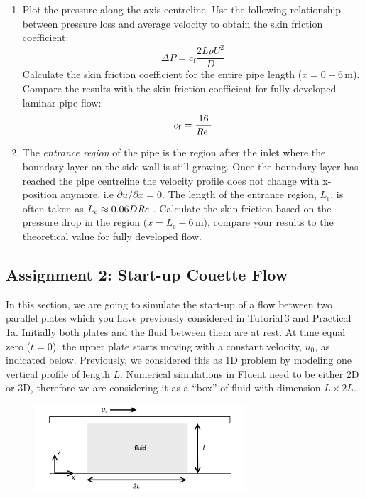 \documentclass[11pt,a4paper,oneside,hidelinks]{scrartcl}
\newcommand\Rey{\mbox{\textit{Re}}\,\,}
\begin{document}
\begin{enumerate}
   \item Plot the pressure along the axis centreline. Use the following relationship between pressure loss and average velocity to obtain the skin friction coefficient: 
\begin{equation}
    \Delta P=c_\mathrm{f}\frac{2L\rho U^2}{D}
\end{equation}
Calculate the skin friction coefficient for the entire pipe length ($x=0-6$\,m). Compare the results with the skin friction coefficient for fully developed laminar pipe flow:
\begin{equation}
    c_\mathrm{f}=\frac{16}{\Rey}
\end{equation}
   \item The \emph{entrance region} of the pipe is the region after the inlet where the boundary layer on the side wall is still growing. Once the boundary layer has reached the pipe centreline the velocity profile does not change with x-position anymore, i.e  $\partial u/\partial x=0$. The length of the entrance region, $L_\mathrm{e}$, is often taken as $L_\mathrm{e}\approx0.06D\Rey$. Calculate the skin friction based on the pressure drop in the region ($x=L_\mathrm{e}-6$\,m), compare your results to the theoretical value for fully developed flow.
\end{enumerate}


\subsection{Assignment 2: Start-up Couette Flow}

In this section, we are going to simulate the start-up of a flow between two parallel plates which you have previously considered in Tutorial\,3 and Practical\,1a. Initially both plates and the fluid between them are at rest. At time equal zero ($t=0$), the upper plate starts moving with a constant velocity, $u_0$, as indicated below. Previously, we considered this as 1D problem by modeling one vertical profile of length $L$. Numerical simulations in Fluent need to be either 2D or 3D, therefore we are considering it as a ``box'' of fluid with dimension $L\times 2L$.

\begin{figure}[H]
\begin{center}
\includegraphics[width=0.7\textwidth,clip]{start_up_flow.png}
\end{center}
\end{figure}
\end{document}
